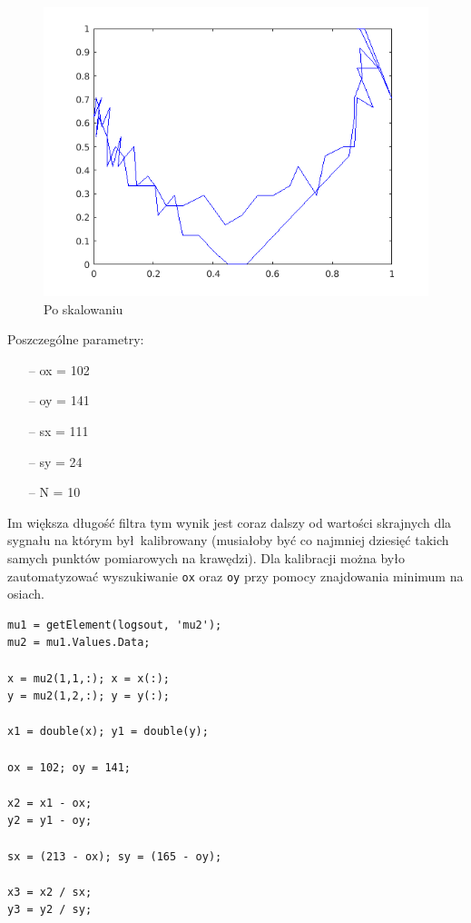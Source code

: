 \documentclass[a4paper, 12pt, titlepage]{article}
\begin{document}
        \begin{figure}[H]
            \centering
            \includegraphics[width=0.8\linewidth]{scaled.png}
            \caption{Po skalowaniu}
        \end{figure}
        Poszczególne parametry:
        \begin{itemize}
            \item[--] ox = 102
            \item[--] oy = 141
            \item[--] sx = 111
            \item[--] sy = 24
            \item[--] N = 10
        \end{itemize}
        Im większa długość filtra tym wynik jest coraz dalszy od 
        wartości skrajnych dla sygnału na którym był kalibrowany
        (musiałoby być co najmniej dziesięć takich samych punktów
        pomiarowych na krawędzi). Dla kalibracji można było 
        zautomatyzować wyszukiwanie \texttt{ox} oraz \texttt{oy}
        przy pomocy znajdowania minimum na osiach.
\begin{lstlisting}
mu1 = getElement(logsout, 'mu2');
mu2 = mu1.Values.Data;

x = mu2(1,1,:); x = x(:);
y = mu2(1,2,:); y = y(:);

x1 = double(x); y1 = double(y);

ox = 102; oy = 141;

x2 = x1 - ox;
y2 = y1 - oy;

sx = (213 - ox); sy = (165 - oy);

x3 = x2 / sx;
y3 = y2 / sy;

\end{lstlisting}
\end{document}
